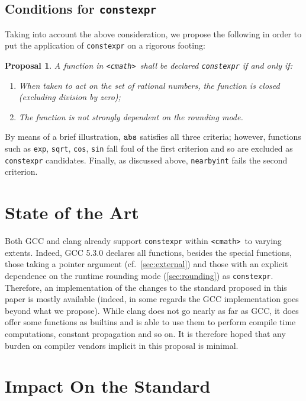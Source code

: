 \documentclass[prd,twocolumn,amsmath,amssymb,nofootinbib,eqsecnum]{revtex4-1}
\newcommand{\constexpr}{\code{constexpr}\xspace}
\newcommand{\code}[1]{{\tt #1}}
\newcommand{\header}[1]{{\tt <#1>}}
\newcommand{\cmath}{\header{cmath}}
\newtheorem*{proposal*}{Proposal}
\begin{document}
\subsection{Conditions for \constexpr}

Taking into account the above consideration, we propose the following in order to put
the application of \constexpr on a rigorous footing:
\begin{proposal*}
	A function in \cmath\ shall be declared \constexpr if and only if:
	\begin{enumerate}
		\item When taken to act on the set of rational numbers, the function is closed (excluding division 
		by zero);
		
		\item The function is not strongly dependent on the rounding mode.
	\end{enumerate}
\end{proposal*}

By means of a brief illustration, $\code{abs}$ satisfies all three criteria; however, functions such as 
\code{exp}, \code{sqrt}, \code{cos}, \code{sin} fall foul of the first criterion and so are excluded as 
\constexpr candidates. Finally, as discussed above, \code{nearbyint} fails the second criterion.


\section{State of the Art}

Both GCC and clang already support \constexpr within \cmath\ to varying extents. 
Indeed, GCC 5.3.0 declares all functions, besides the special functions, those taking a pointer argument
(cf.~\ref{sec:external}) and those with an explicit dependence on the runtime rounding mode (\ref{sec:rounding}) as \constexpr. Therefore, an implementation of the changes to the standard proposed in this paper is mostly available (indeed, in some regards the GCC implementation goes beyond what we propose).
While clang does not go nearly as far as GCC, it does offer some functions as 
builtins and is able to use them to perform compile time computations, constant
propagation and so on. It is therefore hoped that any burden on compiler vendors implicit in this
proposal is minimal.

\section{Impact On the Standard}
\label{sec:impact}
\end{document}
